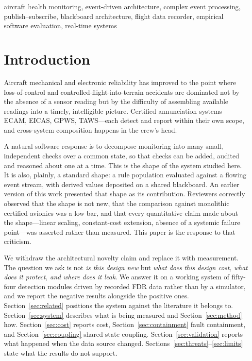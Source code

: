 \documentclass[conference]{IEEEtran}
\begin{document}
\begin{IEEEkeywords}
aircraft health monitoring, event-driven architecture, complex event
processing, publish--subscribe, blackboard architecture, flight data recorder,
empirical software evaluation, real-time systems
\end{IEEEkeywords}

\section{Introduction}

Aircraft mechanical and electronic reliability has improved to the point where
loss-of-control and controlled-flight-into-terrain accidents are dominated not
by the absence of a sensor reading but by the difficulty of assembling
available readings into a timely, intelligible picture. Certified annunciation
systems---ECAM, EICAS, GPWS, TAWS---each detect and report within their own
scope, and cross-system composition happens in the crew's head.

A natural software response is to decompose monitoring into many small,
independent checks over a common state, so that checks can be added, audited
and reasoned about one at a time. This is the shape of the system studied
here. It is also, plainly, a standard shape: a rule population evaluated
against a flowing event stream, with derived values deposited on a shared
blackboard. An earlier version of this work presented that shape as its
contribution. Reviewers correctly observed that the shape is not new, that the
comparison against monolithic certified avionics was a low bar, and that every
quantitative claim made about the shape---linear scaling, constant-cost
extension, absence of a systemic failure point---was asserted rather than
measured. This paper is the response to that criticism.

We withdraw the architectural novelty claim and replace it with measurement.
The question we ask is not \emph{is this design new} but \emph{what does this
design cost, what does it protect, and where does it leak}. We answer it on a
working system of fifty-four detection modules driven by recorded FDR data
rather than by a simulator, and we report the negative results alongside the
positive ones. Section~\ref{sec:related} positions the system against the
literature it belongs to. Section~\ref{sec:system} describes what is being
measured and Section~\ref{sec:method} how. Section~\ref{sec:cost} reports
cost, Section~\ref{sec:containment} fault containment, and
Section~\ref{sec:coupling} shared-state coupling.
Section~\ref{sec:validation} reports what happened when the data
source changed. Sections~\ref{sec:threats}--\ref{sec:limits} state what the
results do not support.
\end{document}
